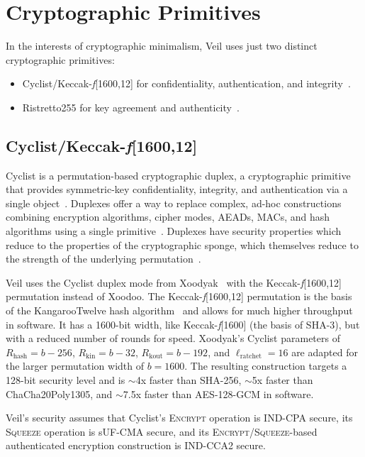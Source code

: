 \section{Cryptographic Primitives}\label{sec:cryptographic-primitives}

In the interests of cryptographic minimalism, Veil uses just two distinct cryptographic primitives:

\begin{itemize}
    \item Cyclist/Keccak-\emph{f}[1600,12] for confidentiality, authentication, and
    integrity~\cite{daemen2020,bertoni2018}.
    \item Ristretto255 for key agreement and authenticity~\cite{deValence2020}.
\end{itemize}

\subsection{Cyclist/Keccak-\emph{f}[1600,12]}\label{subsec:cyclist}

Cyclist is a permutation-based cryptographic duplex, a cryptographic primitive that provides symmetric-key
confidentiality, integrity, and authentication via a single object~\cite{daemen2020}.
Duplexes offer a way to replace complex, ad-hoc constructions combining encryption algorithms, cipher modes,
AEADs, MACs, and hash algorithms using a single primitive~\cite{daemen2020, bertoni2011duplex}.
Duplexes have security properties which reduce to the properties of the cryptographic sponge, which themselves reduce to
the strength of the underlying permutation~\cite{bertoni2008}.

Veil uses the Cyclist duplex mode from Xoodyak~\cite{daemen2020} with the Keccak-\emph{f}[1600,12] permutation instead
of Xoodoo.
The Keccak-\emph{f}[1600,12] permutation is the basis of the KangarooTwelve hash algorithm~\cite{bertoni2018} and allows
for much higher throughput in software.
It has a 1600-bit width, like Keccak-\emph{f}[1600] (the basis of SHA-3), but with a reduced number of rounds for speed.
Xoodyak's Cyclist parameters of $R_\text{hash}=b-256$, $R_\text{kin}=b-32$, $R_\text{kout}=b-192$, and
$\ell_\text{ratchet}=16$ are adapted for the larger permutation width of $b=1600$.
The resulting construction targets a 128-bit security level and is $\sim$4x faster than SHA-256, $\sim$5x faster
than ChaCha20Poly1305, and $\sim$7.5x faster than AES-128-GCM in software.

Veil's security assumes that Cyclist's \textsc{Encrypt} operation is IND-CPA secure, its
\textsc{Squeeze} operation is sUF-CMA secure, and its
\textsc{Encrypt}/\textsc{Squeeze}-based authenticated encryption construction is IND-CCA2 secure.

